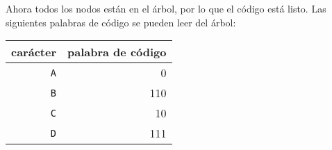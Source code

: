 Ahora todos los nodos están en el árbol, por lo que el código está listo.
Las siguientes palabras de código se pueden leer del árbol:
\begin{center}
\begin{tabular}{rr}
carácter & palabra de código \\
\hline
\texttt{A} & 0 \\
\texttt{B} & 110 \\
\texttt{C} & 10 \\
\texttt{D} & 111 \\
\end{tabular}
\end{center}
